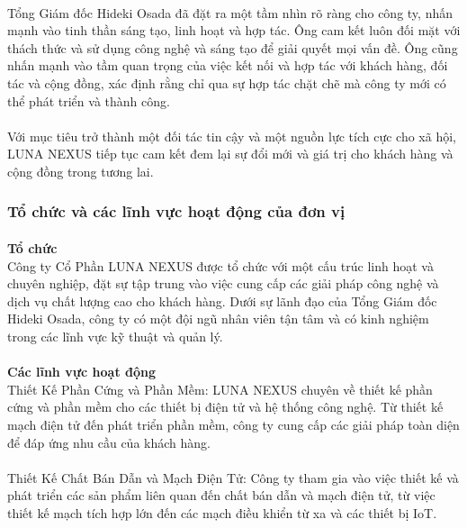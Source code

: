 \begin{flushleft}
		\paragraph{}
		Tổng Giám đốc Hideki Osada đã đặt ra một tầm nhìn rõ ràng cho công ty, nhấn mạnh vào tinh thần sáng tạo, linh hoạt và hợp tác. Ông cam kết luôn đối mặt với thách thức và sử dụng công nghệ và sáng tạo để giải quyết mọi vấn đề. Ông cũng nhấn mạnh vào tầm quan trọng của việc kết nối và hợp tác với khách hàng, đối tác và cộng đồng, xác định rằng chỉ qua sự hợp tác chặt chẽ mà công ty mới có thể phát triển và thành công.
		\paragraph{}
		Với mục tiêu trở thành một đối tác tin cậy và một nguồn lực tích cực cho xã hội, LUNA NEXUS tiếp tục cam kết đem lại sự đổi mới và giá trị cho khách hàng và cộng đồng trong tương lai.
		\subsubsection{Tổ chức và các lĩnh vực hoạt động của đơn vị}
		\paragraph{}
		\textbf{Tổ chức}\\
		Công ty Cổ Phần LUNA NEXUS được tổ chức với một cấu trúc linh hoạt và chuyên nghiệp, đặt sự tập trung vào việc cung cấp các giải pháp công nghệ và dịch vụ chất lượng cao cho khách hàng. Dưới sự lãnh đạo của Tổng Giám đốc Hideki Osada, công ty có một đội ngũ nhân viên tận tâm và có kinh nghiệm trong các lĩnh vực kỹ thuật và quản lý. \\
		\paragraph{}
		\textbf{Các lĩnh vực hoạt động}\\
		Thiết Kế Phần Cứng và Phần Mềm: LUNA NEXUS chuyên về thiết kế phần cứng và phần mềm cho các thiết bị điện tử và hệ thống công nghệ. Từ thiết kế mạch điện tử đến phát triển phần mềm, công ty cung cấp các giải pháp toàn diện để đáp ứng nhu cầu của khách hàng.\\
		\paragraph{}
		Thiết Kế Chất Bán Dẫn và Mạch Điện Tử: Công ty tham gia vào việc thiết kế và phát triển các sản phẩm liên quan đến chất bán dẫn và mạch điện tử, từ việc thiết kế mạch tích hợp lớn đến các mạch điều khiển từ xa và các thiết bị IoT.\\

\end{flushleft}
